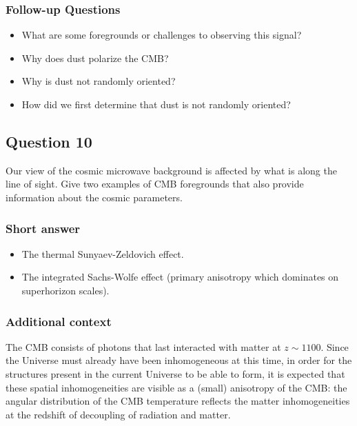 \documentclass[a4paper,11pt]{article}
\begin{document}
\subsubsection{Follow-up Questions}

\begin{itemize}
    \item What are some foregrounds or challenges to observing this signal?
    \item Why does dust polarize the CMB?
    \item Why is dust not randomly oriented?
    \item How did we first determine that dust is not randomly oriented?
\end{itemize}

%
%

\newpage
\subsection{Question 10}

Our view of the cosmic microwave background is affected by what is along the line of sight. Give two examples of CMB foregrounds that also provide information about the cosmic parameters.

\subsubsection{Short answer}

\begin{itemize}
    \item The thermal Sunyaev-Zeldovich effect.
    \item The integrated Sachs-Wolfe effect (primary anisotropy which dominates on superhorizon scales).
\end{itemize}

\subsubsection{Additional context}

{\noindent}The CMB consists of photons that last interacted with matter at $z\sim1100$. Since the Universe must already have been inhomogeneous at this time, in order for the structures present in the current Universe to be able to form, it is expected that these spatial inhomogeneities are visible as a (small) anisotropy of the CMB: the angular distribution of the CMB temperature reflects the matter inhomogeneities at the redshift of decoupling of radiation and matter.
\end{document}
